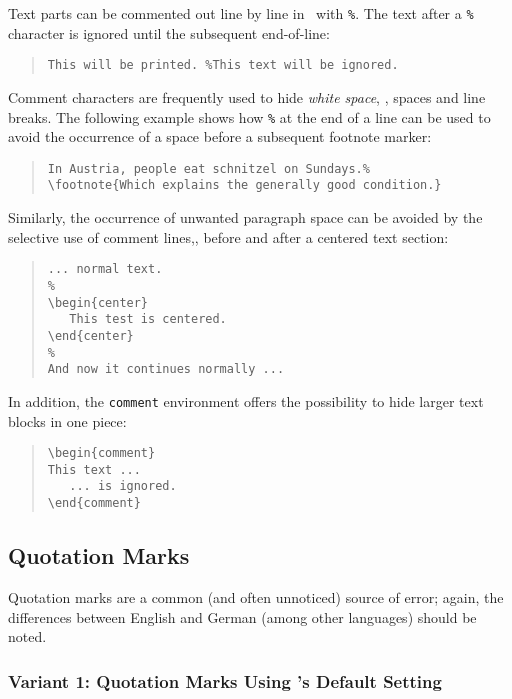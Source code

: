 Text parts can be commented out line by line in \latex\ with \verb!%!. The text
after a \verb!%! character is ignored until the subsequent end-of-line:
%
\begin{quote}
    \verb!This will be printed. %This text will be ignored.!
\end{quote}
%
Comment characters are frequently used to hide \emph{white space}, \ie, spaces
and line breaks. The following example shows how \verb!%! at the end of a line
can be used to avoid the occurrence of a space before a subsequent footnote
marker:
%
\begin{quote}
\begin{verbatim}
In Austria, people eat schnitzel on Sundays.%
\footnote{Which explains the generally good condition.}
\end{verbatim}
\end{quote}
%
Similarly, the occurrence of unwanted paragraph space can be avoided by the
selective use of comment lines,\eg, before and after a centered text section:
%
\begin{quote}
\begin{verbatim}
... normal text.
%
\begin{center}
   This test is centered.
\end{center}
%
And now it continues normally ...
\end{verbatim}
\end{quote}
%
In addition, the \verb!comment! environment offers the possibility to hide
larger text blocks in one piece:
%
\begin{quote}
\begin{verbatim}
\begin{comment}
This text ...
   ... is ignored.
\end{comment}
\end{verbatim}
\end{quote}

\subsection{Quotation Marks}
\label{sec:quotation-marks}

Quotation marks are a common (and often unnoticed) source of error; again, the
differences between English and German (among other languages) should be noted.

\subsubsection{Variant 1: Quotation Marks Using \latex's Default Setting}

